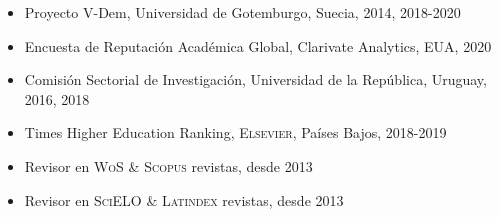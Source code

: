 





\begin{publications}

\begin{itemize}
\item{\small Proyecto V-Dem, Universidad de Gotemburgo, Suecia, 2014, 2018-2020}
\item{\small Encuesta de Reputación Académica Global, Clarivate Analytics, EUA, 2020}
\item{\small Comisión Sectorial de Investigación, Universidad de la Rep\'ublica, Uruguay, 2016, 2018}
\item{\small Times Higher Education Ranking, {\scshape Elsevier}, 
Países Bajos, 2018-2019}
\item{\small Revisor en {\scshape WoS} \& {\scshape Scopus} revistas, desde 2013}
\item{\small Revisor en {\scshape SciELO} \& {\scshape Latindex} revistas, desde 2013}
\end{itemize}

\vspace{1mm}
\end{publications}
